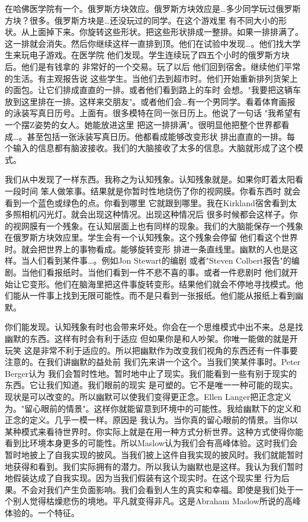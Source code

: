 在哈佛医学院有一个。俄罗斯方块效应。俄罗斯方块效应是…多少同学玩过俄罗斯方块？很多。俄罗斯方块是…还没玩过的同学。在这个游戏里 有不同大小的形状。从上面掉下来。你旋转这些形状。把这些形状排成一整排。如果一排排满了。这一排就会消失。然后你继续这样一直排到顶。他们在试验中发现…。他们找大学生来玩电子游戏。在医学院 他们发现。学生连续玩了四五个小时的俄罗斯方块后。他们是有钱拿的 非常好的一个交易。玩了以后 他们回到宿舍。继续他们平常的生活。有主观报告说 这些学生。当他们去到超市时。他们开始重新排列货架上的面包。让它们排成直直的一排。或者他们看到路上的车时 会想。"我要把这辆车放到这里排在一排。这样来交朋友"。或者他们会…有一个男同学。看着体育画报的泳装写真日历号。上面有。很多模特在同一张日历上。他说了一句话 "我希望有一个摆Z姿势的女人。她能放进这里 把这一排排满"。很明显他把整个世界都看成…。甚至包括一张泳装写真日历。他都看成能够改变形状 排出直直的一排。每个输入的信息都有脑波接收。我们的大脑接收了太多的信息。大脑就形成了这个模式。 

我们从中发现了一样东西。我称之为认知残象。认知残象就是。如果你盯着太阳看一段时间 笨人做笨事。结果就是你暂时性地烧伤了你的视网膜。你看东西时 就会看到一个蓝色或绿色的点。你看到哪里 它就跟到哪里。我在Kirkland宿舍看到太多照相机闪光灯。就会出现这种情况。出现这种情况后 很多时候都会这样子。你的视网膜有一个残象。在认知层面上也有同样的现象。我们的大脑能保存一个残象 在俄罗斯方块效应里。学生会有一个认知残象。这个残象会停留 他们看这个世界时。就会把世界上的事物看成。能够旋转变形 排进一条直线里。幽默的人也是这样。当人们看到某件事…。例如Jon Stewart的编剧 或者"Steven Colbert报告"的编剧。当他们看报纸时。当他们看到一件不悲不喜的事。或者一件悲剧时 他们就开始让它变形。他们在脑海里把这件事旋转变形。结果他们就会不停地寻找模式。他们能从一件事上找到无限可能性。而不是只看到一张报纸。他们能从报纸上看到幽默。 

你们能发现。认知残象有时也会带来坏处。你会在一个思维模式中出不来。总是找幽默的东西。这样有时会有利于适应 但如果你是和人吵架。你唯一能做的就是开玩笑 这是非常不利于适应的。所以把幽默作为改变我们视角的东西还有一件事要注意的。在我们讲幽默的益处前 我们先来讲一个这个。当我们笑某件事时。Peter Berger认为 我们会暂时性地。暂时地中止了现实。我们能看到一些有别于现实的东西。它让我们知道。我们眼前的现实 是可塑的。它不是唯一一种可能的现实。现状是可以改变的。所以幽默可以使我们变得更正念。Ellen Langer把正念定义为。"留心眼前的情景"。这样你就能留意到环境中的可能性。我给幽默下的定义和正念的定义。几乎一模一样。原因是 我认为。当你真的留心眼前的情景。当你以某种模式来看待世界时。你实际上就是在用一种方式分析世界。这种方式使得你能看到比环境本身更多的可能性。所以Maslow认为我们会有高峰体验。这时我们会暂时地披上了自我实现的披风。当我们披上这件自我实现的披风时。我们就能暂时地获得和看到。我们实际拥有的潜力。所以我认为幽默也是这样。我认为我们暂时地假装达成了自我实现。因为当我们假装有这个现实时。在这个现实里 行为后果。不会对我们产生负面影响。我们会看到人生的真实和幸福。即使是我们处于一个别人觉得枯燥悲伤的境地。平凡就变得非凡。这是Abraham Maslow所说的高峰体验的。一个特征。 

